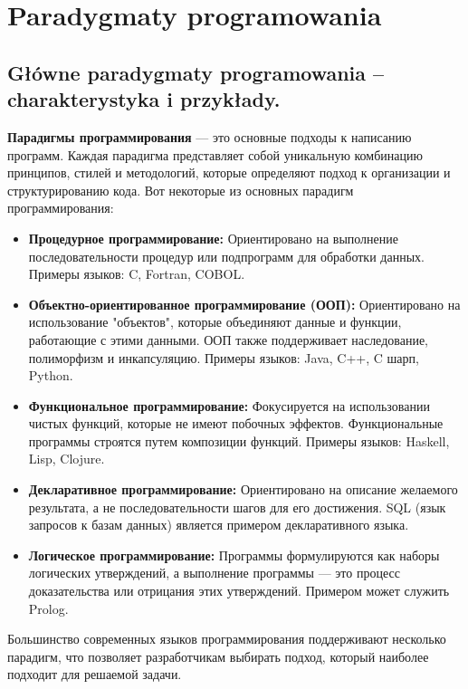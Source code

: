 \chapter{Paradygmaty programowania}
\section{Główne paradygmaty programowania – charakterystyka i przykłady.}

\textbf{Парадигмы программирования} — это основные подходы к написанию программ. Каждая парадигма представляет собой уникальную комбинацию принципов, стилей и методологий, которые определяют подход к организации и структурированию кода. Вот некоторые из основных парадигм программирования:

\begin{itemize}
\item \textbf{Процедурное программирование:} Ориентировано на выполнение последовательности процедур или подпрограмм для обработки данных. Примеры языков: C, Fortran, COBOL.

\item \textbf{Объектно-ориентированное программирование (ООП):} Ориентировано на использование "объектов", которые объединяют данные и функции, работающие с этими данными. ООП также поддерживает наследование, полиморфизм и инкапсуляцию. Примеры языков: Java, C++, C шарп, Python.

\item \textbf{Функциональное программирование:} Фокусируется на использовании чистых функций, которые не имеют побочных эффектов. Функциональные программы строятся путем композиции функций. Примеры языков: Haskell, Lisp, Clojure.

\item \textbf{Декларативное программирование:} Ориентировано на описание желаемого результата, а не последовательности шагов для его достижения. SQL (язык запросов к базам данных) является примером декларативного языка.

\item \textbf{Логическое программирование:} Программы формулируются как наборы логических утверждений, а выполнение программы — это процесс доказательства или отрицания этих утверждений. Примером может служить Prolog.
\end{itemize}

Большинство современных языков программирования поддерживают несколько парадигм, что позволяет разработчикам выбирать подход, который наиболее подходит для решаемой задачи.

